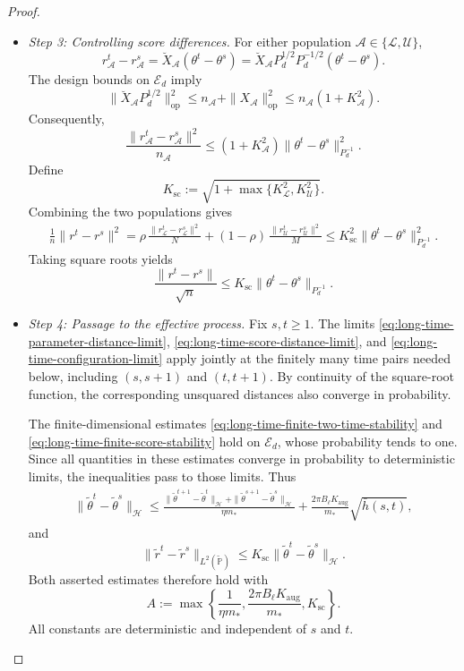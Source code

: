\begin{proof}
\begin{itemize}[wide]
\item \emph{Step 3: Controlling score differences.}
For either population
$\mathcal A\in\{\mathcal L,\mathcal U\}$,
\[
    r_{\mathcal A}^t-r_{\mathcal A}^s
    =
    \breve X_{\mathcal A}(\theta^t-\theta^s)
    =
    \breve X_{\mathcal A}P_d^{1/2}
    P_d^{-1/2}(\theta^t-\theta^s).
\]
The design bounds on $\mathcal E_d$ imply
\[
    \|\breve X_{\mathcal A}P_d^{1/2}\|_{\mathrm{op}}^2
    \leq
    n_{\mathcal A}+\|X_{\mathcal A}\|_{\mathrm{op}}^2
    \leq n_{\mathcal A}(1+K_{\mathcal A}^2).
\]
Consequently,
\[
    \frac{\|r_{\mathcal A}^t-r_{\mathcal A}^s\|^2}
         {n_{\mathcal A}}
    \leq
    (1+K_{\mathcal A}^2)
    \|\theta^t-\theta^s\|_{P_d^{-1}}^2.
\]
Define
\[
    K_{\mathrm{sc}}
    :=
    \sqrt{1+\max\{K_{\mathcal L}^2,K_{\mathcal U}^2\}}.
\]
Combining the two populations gives
\[
\begin{aligned}
    \frac1n\|r^t-r^s\|^2
    =
    \rho\,\frac{\|r_{\mathcal L}^t-r_{\mathcal L}^s\|^2}{N}
    +(1-\rho)\,
        \frac{\|r_{\mathcal U}^t-r_{\mathcal U}^s\|^2}{M}
    \leq
    K_{\mathrm{sc}}^2
    \|\theta^t-\theta^s\|_{P_d^{-1}}^2.
\end{aligned}
\]
Taking square roots yields
\begin{equation}
    \frac{\|r^t-r^s\|}{\sqrt n}
    \leq
    K_{\mathrm{sc}}
    \|\theta^t-\theta^s\|_{P_d^{-1}}.
    \label{eq:long-time-finite-score-stability}
\end{equation}

\item \emph{Step 4: Passage to the effective process.}
Fix $s,t\geq1$.
The limits \eqref{eq:long-time-parameter-distance-limit},
\eqref{eq:long-time-score-distance-limit}, and
\eqref{eq:long-time-configuration-limit}
apply jointly at the finitely many time pairs needed below,
including $(s,s+1)$ and $(t,t+1)$.
By continuity of the square-root function, the corresponding
unsquared distances also converge in probability.

The finite-dimensional estimates
\eqref{eq:long-time-finite-two-time-stability} and
\eqref{eq:long-time-finite-score-stability}
hold on $\mathcal E_d$, whose probability tends to one.
Since all quantities in these estimates converge in probability
to deterministic limits, the inequalities pass to those limits.
Thus
\[
\begin{aligned}
    \|\tilde\theta^t-\tilde\theta^s\|_{\mathcal H}
    \leq
    \frac{
        \|\tilde\theta^{t+1}-\tilde\theta^t\|_{\mathcal H}
        +\|\tilde\theta^{s+1}-\tilde\theta^s\|_{\mathcal H}
    }{\eta m_*}
    +
    \frac{2\pi B_\ell K_{\mathrm{aug}}}{m_*}
        \sqrt{\bar h(s,t)},
\end{aligned}
\]
and
\[
    \|\tilde r^t-\tilde r^s\|_{L^2(\tilde{\mathbb P})}
    \leq
    K_{\mathrm{sc}}
    \|\tilde\theta^t-\tilde\theta^s\|_{\mathcal H}.
\]
Both asserted estimates therefore hold with
\[
    A:=
    \max\left\{
        \frac1{\eta m_*},
        \frac{2\pi B_\ell K_{\mathrm{aug}}}{m_*},
        K_{\mathrm{sc}}
    \right\}.
\]
All constants are deterministic and independent of $s$ and $t$.


\end{itemize}
\end{proof}

